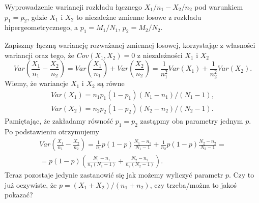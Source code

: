 \documentclass[12pt]{mwrep}
\begin{document}
Wyprowadzenie wariancji rozkładu łącznego $X_1/n_1-X_2/n_2$ pod warunkiem $p_1=p_2$, gdzie $X_1$ i $X_2$ to niezależne zmienne losowe z rozkładu hipergeometrycznego, a $p_1=M_1/N_1$, $p_2=M_2/N_2$.

Zapiszmy łączną wariancję rozważanej zmiennej losowej, korzystając z własności wariancji oraz tego, że $Cov(X_1,X_2)=0$ z niezależności $X_1$ i $X_2$
\begin{equation}
Var\left(\frac{X_1}{n_1}-\frac{X_2}{n_2}\right)=Var\left(\frac{X_1}{n_1}\right) + Var\left(\frac{X_2}{n_2}\right)=\frac{1}{n_1^2}Var(X_1)+\frac{1}{n_2^2}Var(X_2).
\end{equation}
Wiemy, że wariancje $X_1$ i $X_2$ są równe
\begin{align}
Var(X_1)=n_1 p_1 (1-p_1)(N_1-n_1)/(N_1-1),\\
Var(X_2)=n_2 p_2 (1-p_2)(N_2-n_2)/(N_2-1).
\end{align}
Pamiętając, że zakładamy równość $p_1=p_2$ zastąpmy oba parametry jednym $p$. Po podstawieniu otrzymujemy
\begin{equation}
\begin{split}
Var\left(\frac{X_1}{n_1}-\frac{X_2}{n_2}\right)=\frac{1}{n_1}p(1-p)\frac{N_1-n_1}{N_1-1} + \frac{1}{n_2}p(1-p)\frac{N_2-n_2}{N_2-1}= \\
=p(1-p)\left(\frac{N_1-n_1}{n_1(N_1-1)}+\frac{N_2-n_2}{n_2(N_2-1)}\right).
\end{split}
\end{equation}
Teraz pozostaje jedynie zastanowić się jak możemy wyliczyć parametr $p$. Czy to już oczywiste, że $p=(X_1+X_2)/(n_1+n_2)$, czy trzeba/można to jakoś pokazać?
\end{document}
